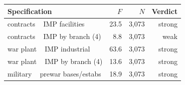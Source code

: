 \begin{tabular}{lrrr}
\toprule
Specification & $F$ & $N$ & Verdict \\
\midrule
contracts ~ IMP facilities & 23.5 & 3,073 & strong \\
contracts ~ IMP by branch (4) & 8.8 & 3,073 & weak \\
war plant ~ IMP industrial & 63.6 & 3,073 & strong \\
war plant ~ IMP by branch (4) & 13.6 & 3,073 & strong \\
military ~ prewar bases/estabs & 18.9 & 3,073 & strong \\
\bottomrule
\end{tabular}